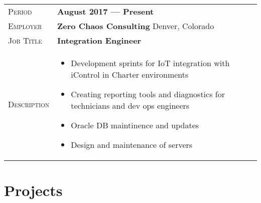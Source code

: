 \documentclass[a4paper, oneside, final]{scrartcl} %
\newcommand{\gray}{\rowcolor[gray]{.90}} %
\begin{document}
\begin{center}
    \begin{tabularx}{0.97\linewidth}{>{\raggedleft\scshape}p{3cm}X}
    \gray Period & \textbf{August 2017 --- Present}\\
    \gray Employer & \textbf{Zero Chaos Consulting} \hfill Denver, Colorado\\
    \gray Job Title & \textbf{Integration Engineer}\\
      Description & \begin{itemize}
    \item Development sprints for IoT integration with iControl in Charter environments 
    \item Creating reporting tools and diagnostics for technicians and dev ops engineers
    \item Oracle DB maintinence and updates
    \item Design and maintenance of servers 
    \end{itemize}
    \end{tabularx}
    \vspace{5pt}



      \section{Projects}


\end{center}
\end{document}
